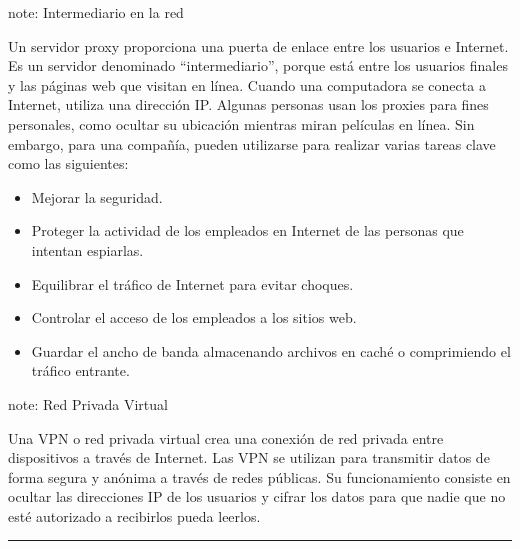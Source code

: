 \documentclass[letterpaper,10pt,spanish]{sphinxmanual}
\begin{document}
\begin{sphinxadmonition}{note}{: Intermediario en la red}

\sphinxAtStartPar
Un servidor proxy proporciona una puerta de enlace entre los usuarios e Internet. Es un servidor denominado “intermediario”, porque está entre los usuarios finales y las páginas web que visitan en línea. Cuando una computadora se conecta a Internet, utiliza una dirección IP.  Algunas personas usan los proxies para fines personales, como ocultar su ubicación mientras miran películas en línea. Sin embargo, para una compañía, pueden utilizarse para realizar varias tareas clave como las siguientes:
\begin{itemize}
\item {} 
\sphinxAtStartPar
Mejorar la seguridad.

\item {} 
\sphinxAtStartPar
Proteger la actividad de los empleados en Internet de las personas que intentan espiarlas.

\item {} 
\sphinxAtStartPar
Equilibrar el tráfico de Internet para evitar choques.

\item {} 
\sphinxAtStartPar
Controlar el acceso de los empleados a los sitios web.

\item {} 
\sphinxAtStartPar
Guardar el ancho de banda almacenando archivos en caché o comprimiendo el tráfico entrante.

\end{itemize}
\end{sphinxadmonition}

\begin{sphinxadmonition}{note}{: Red Privada Virtual}

\sphinxAtStartPar
Una VPN o red privada virtual crea una conexión de red privada entre dispositivos a través de Internet. Las VPN se utilizan para transmitir datos de forma segura y anónima a través de redes públicas. Su funcionamiento consiste en ocultar las direcciones IP de los usuarios y cifrar los datos para que nadie que no esté autorizado a recibirlos pueda leerlos.
\end{sphinxadmonition}


\bigskip\hrule\bigskip
\end{document}
